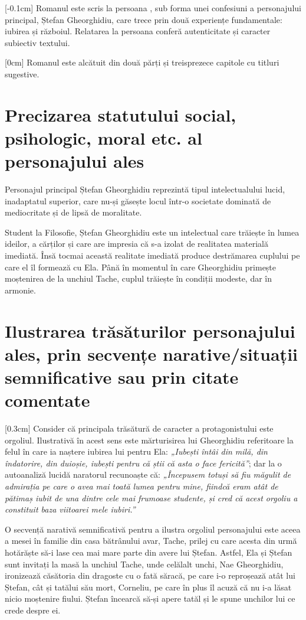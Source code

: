 [-0.1cm]
Romanul este scris la persoana , sub forma unei confesiuni a personajului principal, Ștefan Gheorghidiu, care trece prin două experiențe fundamentale: iubirea și războiul. Relatarea la persoana  conferă autenticitate și caracter subiectiv textului.

[0cm]
Romanul este alcătuit din două părți și treisprezece capitole cu titluri sugestive.

\clearpage


\section{Precizarea statutului social, psihologic, moral etc. al personajului ales}

Personajul principal Ștefan Gheorghidiu reprezintă tipul intelectualului lucid, inadaptatul superior, care nu-și găsește locul într-o societate dominată de mediocritate și de lipsă de moralitate.

Student la Filosofie, Ștefan Gheorghidiu este un intelectual care trăiește în lumea ideilor, a cărților și care are impresia că s-a izolat de realitatea materială imediată. Însă tocmai această realitate imediată produce destrămarea cuplului pe care el îl formează cu Ela. Până în momentul în care Gheorghidiu primește moștenirea de la unchiul Tache, cuplul trăiește în condiții modeste, dar în armonie.


\section{Ilustrarea trăsăturilor personajului ales, prin secvențe narative/situații semnificative sau prin citate comentate}

[0.3cm]
Consider că principala trăsătură de caracter a protagonistului este orgoliul. Ilustrativă în acest sens este mărturisirea lui Gheorghidiu referitoare la felul în care ia naștere iubirea lui pentru Ela: \textit{„Iubești întâi din milă, din îndatorire, din duioșie, iubești pentru că știi că asta o face fericită”}; dar la o autoanaliză lucidă naratorul recunoaște că: \textit{„Începusem totuși să fiu măgulit de admirația pe care o avea mai toată lumea pentru mine, fiindcă eram atât de pătimaș iubit de una dintre cele mai frumoase studente, și cred că acest orgoliu a constituit baza viitoarei mele iubiri.”}

O secvență narativă semnificativă pentru a ilustra orgoliul personajului este aceea a mesei în familie din casa bătrânului avar, Tache, prilej cu care acesta din urmă hotărăște să-i lase cea mai mare parte din avere lui Ștefan. Astfel, Ela și Ștefan sunt invitați la masă la unchiul Tache, unde celălalt unchi, Nae Gheorghidiu, ironizează căsătoria din dragoste cu o fată săracă, pe care i-o reproșează atât lui Ștefan, cât și tatălui său mort, Corneliu, pe care în plus îl acuză că nu i-a lăsat nicio moștenire fiului. Ștefan încearcă să-și apere tatăl și le spune unchilor lui ce crede despre ei.

